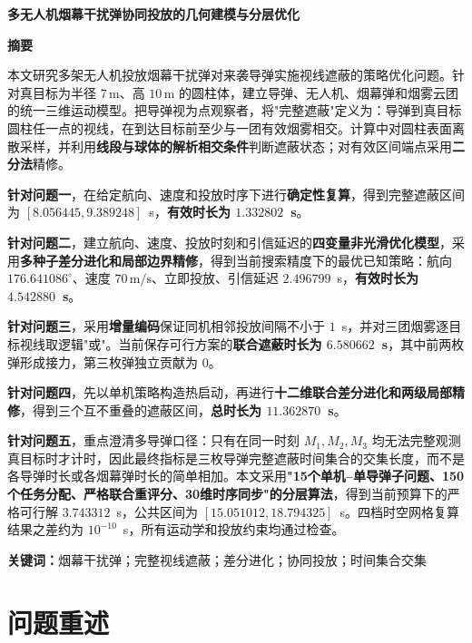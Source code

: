 \documentclass[12pt,a4paper]{article}
\begin{document}
\begin{center}
{\LARGE\heiti\bfseries 多无人机烟幕干扰弹协同投放的几何建模与分层优化}
\end{center}
\vspace{0.5em}

\begin{center}
{\Large\heiti\bfseries 摘\quad 要}
\end{center}

本文研究多架无人机投放烟幕干扰弹对来袭导弹实施视线遮蔽的策略优化问题。针对真目标为半径 $7\,\mathrm{m}$、高 $10\,\mathrm{m}$ 的圆柱体，建立导弹、无人机、烟幕弹和烟雾云团的统一三维运动模型。把导弹视为点观察者，将"完整遮蔽"定义为：导弹到真目标圆柱任一点的视线，在到达目标前至少与一团有效烟雾相交。计算中对圆柱表面离散采样，并利用\textbf{线段与球体的解析相交条件}判断遮蔽状态；对有效区间端点采用\textbf{二分法}精修。

\textbf{针对问题一}，在给定航向、速度和投放时序下进行\textbf{确定性复算}，得到完整遮蔽区间为 $[8.056445,9.389248]$~s，\textbf{有效时长为 $1.332802$~s}。

\textbf{针对问题二}，建立航向、速度、投放时刻和引信延迟的\textbf{四变量非光滑优化模型}，采用\textbf{多种子差分进化和局部边界精修}，得到当前搜索精度下的最优已知策略：航向 $176.641086^\circ$、速度 $70\,\mathrm{m/s}$、立即投放、引信延迟 $2.496799$~s，\textbf{有效时长为 $4.542880$~s}。

\textbf{针对问题三}，采用\textbf{增量编码}保证同机相邻投放间隔不小于 $1$~s，并对三团烟雾逐目标视线取逻辑"或"。当前保存可行方案的\textbf{联合遮蔽时长为 $6.580662$~s}，其中前两枚弹形成接力，第三枚弹独立贡献为 $0$。

\textbf{针对问题四}，先以单机策略构造热启动，再进行\textbf{十二维联合差分进化和两级局部精修}，得到三个互不重叠的遮蔽区间，\textbf{总时长为 $11.362870$~s}。

\textbf{针对问题五}，重点澄清多导弹口径：只有在同一时刻 $M_1,M_2,M_3$ 均无法完整观测真目标时才计时，因此最终指标是三枚导弹完整遮蔽时间集合的交集长度，而不是各导弹时长或各烟幕弹时长的简单相加。本文采用\textbf{"15个单机--单导弹子问题、150个任务分配、严格联合重评分、30维时序同步"的分层算法}，得到当前预算下的严格可行解 $3.743312$~s，公共区间为 $[15.051012,18.794325]$~s。四档时空网格复算结果之差约为 $10^{-10}$~s，所有运动学和投放约束均通过检查。

\noindent\textbf{关键词：}烟幕干扰弹；完整视线遮蔽；差分进化；协同投放；时间集合交集

\newpage
\section{问题重述}
\end{document}
